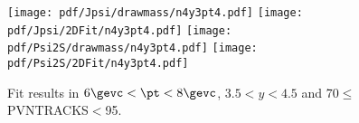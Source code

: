 \begin{figure}[H]
\begin{center}
\texttt{[image: pdf/Jpsi/drawmass/n4y3pt4.pdf]}
\texttt{[image: pdf/Jpsi/2DFit/n4y3pt4.pdf]}
\vspace*{-0.5cm}
\texttt{[image: pdf/Psi2S/drawmass/n4y3pt4.pdf]}
\texttt{[image: pdf/Psi2S/2DFit/n4y3pt4.pdf]}
\vspace*{-0.5cm}
\end{center}
\caption{Fit results in $6\gevc<\pt<8\gevc$, $3.5<y<4.5$ and 70$\leq$PVNTRACKS$<$95.}
\label{Fitn4y3pt4}
\end{figure}
